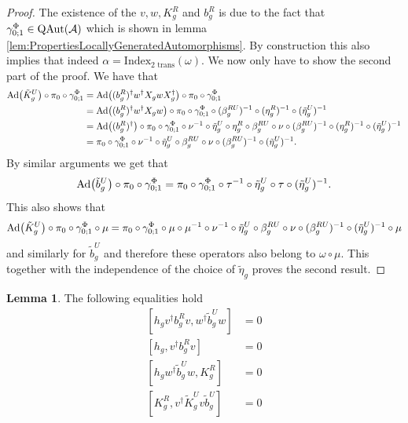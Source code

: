 \documentclass[12pt,a4paper,twoside]{article}
\let\originalleft\left
\let\originalright\right
\renewcommand{\left}{\mathopen{}\mathclose\bgroup\originalleft}
\renewcommand{\right}{\aftergroup\egroup\originalright}
\renewcommand{\AA}{\mathcal A}
\newcommand{\Ad}[1]{\textrm{Ad}\left(#1\right)}
\newcommand{\QAut}[1]{\textrm{QAut}\left(#1\right)}
\theoremstyle{definition}
\newtheorem{lemma}[theorem]{Lemma}
\numberwithin{equation}{section}
\begin{document}
\begin{proof}
	The existence of the $v,w,K_g^R$ and $b_g^R$ is due to the fact that $\gamma^\Phi_{0;1}\in \QAut{\AA}$ which is shown in lemma \ref{lem:PropertiesLocallyGeneratedAutomorphisms}. By construction this also implies that indeed $\alpha=\textrm{Index}_{\text{2 trans}}(\omega)$. We now only have to show the second part of the proof. We have that
	\begin{align}
		\Ad{\tilde{K}_g^U}\circ\pi_0\circ\gamma^\Phi_{0;1}&=\Ad{(b_g^R)^\dagger w^\dagger X_g w X_g^\dagger}\circ\pi_0\circ\gamma^\Phi_{0;1}\\
		&=\Ad{(b_g^R)^\dagger w^\dagger X_g w}\circ\pi_0\circ\gamma^\Phi_{0;1}\circ(\beta_g^{RU})^{-1}\circ(\eta_g^R)^{-1}\circ(\tilde{\eta}_g^U)^{-1}\\
		&=\Ad{(b_g^R)^\dagger}\circ\pi_0\circ\gamma^\Phi_{0;1}\circ\nu^{-1}\circ\tilde{\eta}_g^U\circ\eta_g^R\circ\beta_g^{RU}\circ\nu\circ(\beta_g^{RU})^{-1}\circ(\eta_g^R)^{-1}\circ(\tilde{\eta}_g^U)^{-1}\\
		&=\pi_0\circ\gamma^\Phi_{0;1}\circ\nu^{-1}\circ\tilde{\eta}_g^U\circ\beta_g^{RU}\circ\nu\circ(\beta_g^{RU})^{-1}\circ(\tilde{\eta}_g^U)^{-1}.
	\end{align}
	By similar arguments we get that
	\begin{equation}
		\Ad{\tilde{b}_g^U}\circ\pi_0\circ\gamma^\Phi_{0;1}=\pi_0\circ\gamma^\Phi_{0;1}\circ\tau^{-1}\circ\tilde{\eta}_g^U\circ\tau\circ(\tilde{\eta}_g^U)^{-1}.
	\end{equation}
	This also shows that
	\begin{equation}
		\Ad{\tilde{K}_g^U}\circ\pi_0\circ\gamma^\Phi_{0;1}\circ\mu=\pi_0\circ\gamma^\Phi_{0;1}\circ\mu\circ\mu^{-1}\circ\nu^{-1}\circ\tilde{\eta}_g^U\circ\beta_g^{RU}\circ\nu\circ(\beta_g^{RU})^{-1}\circ(\tilde{\eta}_g^U)^{-1}\circ\mu
	\end{equation}
	and similarly for $\tilde{b}_g^U$ and therefore these operators also belong to $\omega\circ\mu$. This together with the independence of the choice of $\tilde{\eta}_g$ proves the second result.
\end{proof}
\begin{lemma}
	The following equalities hold
	\begin{align}
		\label{eq:H^1IndexRotationInvariantCommutator1}
		[h_g v^\dagger b_g^R v,w^\dagger \tilde{b}_g^U w]&=0\\
		\label{eq:H^1IndexRotationInvariantCommutator2}
		[h_g, v^\dagger b_g^R v]&=0\\
		\label{eq:H^1IndexRotationInvariantCommutator3}
		[h_g w^\dagger \tilde{b}_g^U w,K_g^R]&=0\\
		\label{eq:H^1IndexRotationInvariantCommutator4}
		[K_g^R,v^\dagger \tilde{K}_g^U v\tilde{b}_g^U]&=0
	\end{align}
\end{lemma}
\end{document}
